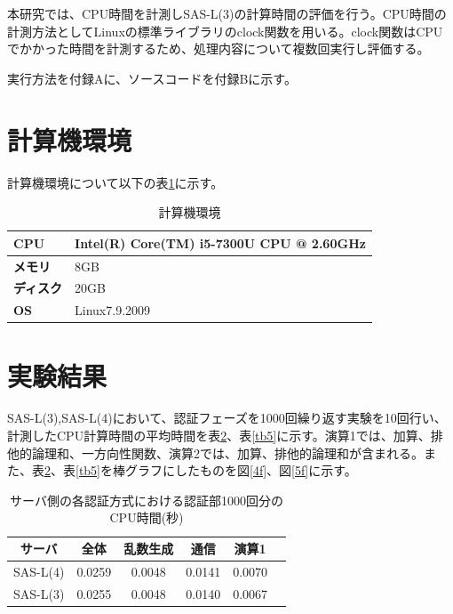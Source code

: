\documentclass{thesis}
\begin{document}
本研究では、CPU時間を計測しSAS-L(3)の計算時間の評価を行う。CPU時間の計測方法としてLinuxの標準ライブラリのclock関数を用いる。clock関数はCPUでかかった時間を計測するため、処理内容について複数回実行し評価する。


実行方法を付録Aに、ソースコードを付録Bに示す。
\section{計算機環境}
計算機環境について以下の表\ref{tab3}に示す。
\begin{table}[H]
		\begin{center}
			\caption{計算機環境}
			\label{tab3}
			\begin{tabular}{|l||l|}
				\hline
				\textbf{CPU}   & Intel(R) Core(TM) i5-7300U CPU @ 2.60GHz\\ \hline
				\textbf{メモリ}   & 8GB                    \\ \hline
				\textbf{ディスク} & 20GB                   \\ \hline
				\textbf{OS} &Linux7.9.2009             \\ \hline
			\end{tabular}
		\end{center}
\end{table}

	
\section{実験結果}
SAS-L(3),SAS-L(4)において、認証フェーズを1000回繰り返す実験を10回行い、計測したCPU計算時間の平均時間を表\ref{tb4}、表\ref{tb5}に示す。演算1では、加算、排他的論理和、一方向性関数、演算2では、加算、排他的論理和が含まれる。また、表\ref{tb4}、表\ref{tb5}を棒グラフにしたものを図\ref{4f}、図\ref{5f}に示す。


	\begin{table}[H]
		\begin{center}
			\caption{サーバ側の各認証方式における認証部1000回分のCPU時間(秒)}
			\label{tb4}
			\begin{tabular}{|c|c|c|c|c|c|}
				\hline
				サーバ &全体& 乱数生成 & 通信 & 演算1\\ \hline \hline
				SAS-L(4)         & 0.0259        & 0.0048       & 0.0141&0.0070\\ \hline
				SAS-L(3)        & 0.0255       & 0.0048       & 0.0140&0.0067\\ \hline
			\end{tabular}
		\end{center}
	\end{table}
	
\end{document}
